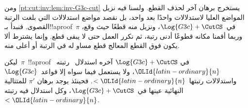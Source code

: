 \documentclass[../../../include/open-logic-section]{subfiles}
\begin{document}
ومن \cref{pt:cut:inv:lem:inv-G3c-cut} يستخرج برهان آخر لحذف القطع. ولسنا
فيه نزيل المواضع العليا لاستدلالات \CutCS{} واحدًا بعد واحد، بل نقصد
مواضع استدلالات \CutCS{} التي بلغت الرتبة القصوى. فنبدأ بـ!!a{proof}~$\pi$
في~$\Log{G3c} + \CutCS$، ونزيل منه قطعًا حيث وقع، وربما أقمنا مكانه قطوعًا
أدنى رتبة، ثم نكرر العمل حتى لا يبقى قطع. وإنما يشترط ألا يكون فوق القطع
المعالج قطع مساو له في الرتبة أو أعلى منه.

\begin{lem} ليكن~$\pi$~!!a{proof} في
$\Log{G3c}+\CutCS$ آخره استدلال~\CutCS{} رتبته~${\OLId{latin-ordinary}{n}}$، ولا يستعمل فيما سواه
إلا قواعد~$\Log{G3c}$ واستدلالات \CutCS{} رتبتها~$<{\OLId{latin-ordinary}{n}}$. فحينئذ يوجد برهان
$\pi'$ للمتتالية النهائية عينها في~$\Log{G3c} + \CutCS$، وكل استدلال
\CutCS{} فيه رتبته~$<{\OLId{latin-ordinary}{n}}$.
\end{lem}
\end{document}
